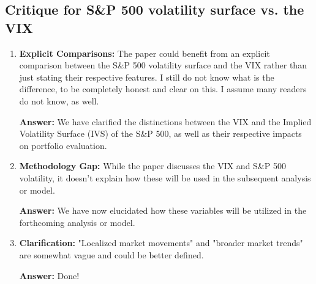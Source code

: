 \subsection{Critique for S\&P 500 volatility surface vs. the VIX}
\begin{enumerate}
\item \textbf{Explicit Comparisons:} The paper could benefit from an explicit comparison between the S\&P 500 volatility surface and the VIX rather than just stating their respective features. I still do not know what is the difference, to be completely honest and clear on this. I assume many readers do not know, as well.

\textbf{Answer:}
We have clarified the distinctions between the VIX and the Implied Volatility Surface (IVS) of the S\&P 500, as well as their respective impacts on portfolio evaluation.

\item \textbf{Methodology Gap:} While the paper discusses the VIX and S\&P 500 volatility, it doesn't explain how these will be used in the subsequent analysis or model.

\textbf{Answer:}
We have now elucidated how these variables will be utilized in the forthcoming analysis or model.

\item \textbf{Clarification:} "Localized market movements" and "broader market trends" are somewhat vague and could be better defined.

\textbf{Answer:}
Done!

\end{enumerate}

